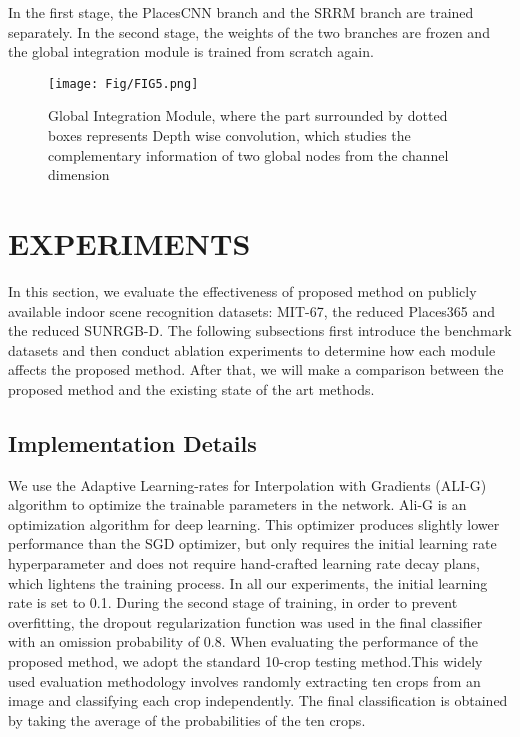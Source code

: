 \documentclass[conference]{IEEEtran}
\begin{document}
In the first stage, the PlacesCNN branch and the SRRM branch are trained separately. In the second stage, the weights of the two branches are frozen and the global integration module is trained from scratch again.

\begin{figure*}[htbp]
    \centering
    \texttt{[image: Fig/FIG5.png]}
    \caption{Global Integration Module, where the part surrounded by dotted boxes represents Depth wise convolution, which studies the complementary information of two global nodes from the channel dimension}
    \label{Fig5}
\end{figure*}

\section{EXPERIMENTS}

In this section, we evaluate the effectiveness of proposed method on publicly available indoor scene recognition datasets: MIT-67\cite{ref8}, the reduced Places365\cite{ref14} and the reduced SUNRGB-D\cite{ref30}. The following subsections first introduce the benchmark datasets and then conduct ablation experiments to determine how each module affects the proposed method. After that, we will make a comparison between the proposed method and the existing state of the art methods.

\subsection{Implementation Details}

We use the Adaptive Learning-rates for Interpolation with Gradients (ALI-G) \cite{ref31} algorithm to optimize the trainable parameters in the network. Ali-G is an optimization algorithm for deep learning. This optimizer produces slightly lower performance than the SGD optimizer, but only requires the initial learning rate hyperparameter and does not require hand-crafted learning rate decay plans, which lightens the training process. In all our experiments, the initial learning rate is set to 0.1. During the second stage of training, in order to prevent overfitting, the dropout regularization function was used in the final classifier with an omission probability of 0.8. When evaluating the performance of the proposed method, we adopt the standard 10-crop testing method\cite{ref33}.This widely used evaluation methodology involves randomly extracting ten crops from an image and classifying each crop independently. The final classification is obtained by taking the average of the probabilities of the ten crops.
\end{document}
